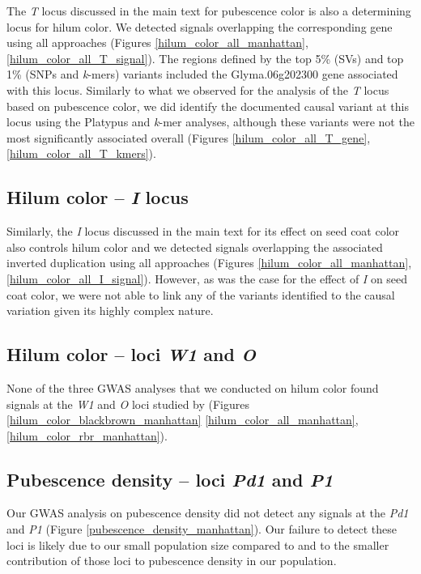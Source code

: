 \documentclass[12pt]{article}
\begin{document}
The \textit{T} locus discussed in the main text for pubescence color is also a determining
locus for hilum color. We detected signals overlapping the corresponding gene
using all approaches (Figures \ref{hilum_color_all_manhattan},
\ref{hilum_color_all_T_signal}). The regions defined by the top 5\% (SVs)
and top 1\% (SNPs and \textit{k}-mers) variants included
the Glyma.06g202300 gene associated with this locus. Similarly to what we
observed for the analysis of the \textit{T} locus based on pubescence color, we
did identify the documented causal variant at this locus using the Platypus and
\textit{k}-mer analyses, although these variants were not the most
significantly associated overall (Figures \ref{hilum_color_all_T_gene},
\ref{hilum_color_all_T_kmers}).

\subsection*{Hilum color -- \textit{I} locus}
\label{annexe-sv-gwas-results-hilum-color-i}

Similarly, the \textit{I} locus discussed in the main text for its effect on seed coat
color also controls hilum color and we detected signals overlapping the
associated inverted duplication using all approaches (Figures
\ref{hilum_color_all_manhattan}, \ref{hilum_color_all_I_signal}). However,
as was the case for the effect of \textit{I} on seed coat color, we were
not able to link any of the variants identified to the causal variation given
its highly complex nature.

\subsection*{Hilum color -- loci \textit{W1} and \textit{O}}
\label{sv-gwas-hilum-color}

None of the three GWAS analyses that we conducted on hilum color found signals
at the \emph{W1} and \emph{O} loci studied by  (Figures
\ref{hilum_color_blackbrown_manhattan} \ref{hilum_color_all_manhattan},
\ref{hilum_color_rbr_manhattan}).

\subsection*{Pubescence density -- loci \textit{Pd1} and \textit{P1}}
\label{sv-gwas-pubescence-density}

Our GWAS analysis on pubescence density did not detect any signals at the
\emph{Pd1} and \emph{P1} (Figure \ref{pubescence_density_manhattan}). Our
failure to detect these loci is likely due to our small population size
compared to  and to the smaller contribution of those loci
to pubescence density in our population.
\end{document}
